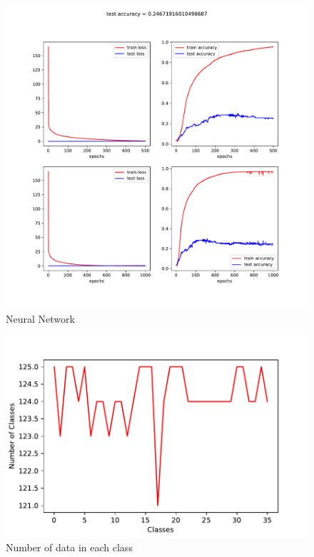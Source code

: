 \documentclass[17pt]{article}
\begin{document}
\begin{figure}
	\label{figNN}
	\includegraphics[scale=0.5]{results}
	\caption{Neural Network}
\end{figure}
\begin{figure}
	\label{figNN}
\includegraphics[scale=1]{numberOfTrainClasses}
	\caption{Number of data in each class}
\end{figure}
\end{document}
